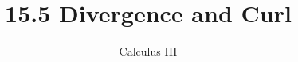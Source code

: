 \documentclass{article}
\begin{document}
\title{15.5 Divergence and Curl}
\author{Calculus III}
\date{}
\maketitle

\end{document}
